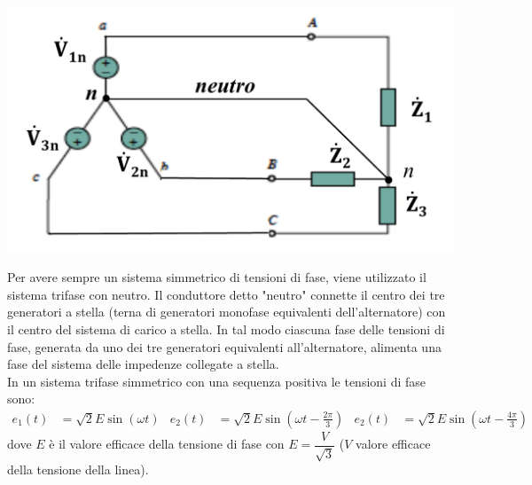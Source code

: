 \documentclass{article}
\begin{document}
\begin{center}
    \includegraphics[scale=0.27]{Image/Sistemi_trifase_neutro_2.png}
\end{center}
Per avere sempre un sistema simmetrico di tensioni di fase, viene utilizzato il sistema trifase con neutro. Il conduttore detto "neutro" connette il centro dei tre generatori a stella (terna di generatori monofase equivalenti dell'alternatore) con il centro
del sistema di carico a stella. In tal modo ciascuna fase delle tensioni di fase, generata da uno dei tre generatori equivalenti all'alternatore, alimenta una fase del sistema delle impedenze collegate a stella.
\vspace*{0.2cm}\\
In un sistema trifase simmetrico con una sequenza positiva le tensioni di fase sono:
\begin{align*}
    e_1(t) &= \sqrt{2} E \sin(\omega t) 
    &
    e_2(t) &= \sqrt{2} E \sin(\omega t - \frac{2 \pi}{3})
    &
    e_2(t) &= \sqrt{2} E \sin(\omega t - \frac{4 \pi}{3})
\end{align*}
dove $E$ è il valore efficace della tensione di fase con $E = \dfrac{V}{\sqrt{3}}$ ($V$ valore efficace della tensione della linea).
\end{document}
